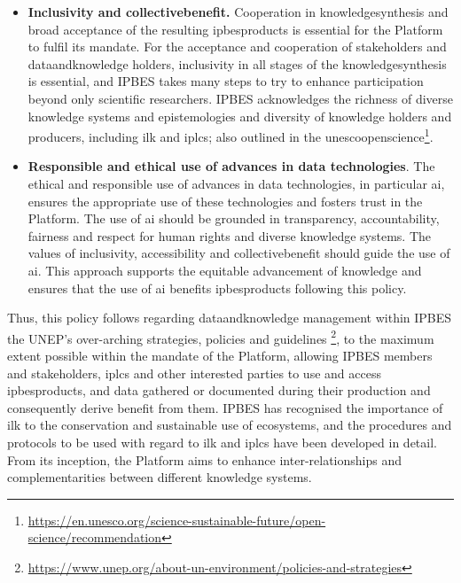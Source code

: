 \documentclass{article}
\begin{document}
\begin{itemize}
    \item \textbf{Inclusivity and \gls{collectivebenefit}.} Cooperation in \gls{knowledgesynthesis} and broad acceptance of the resulting \glspl{ipbesproduct} is essential for the Platform to fulfil its mandate. For the acceptance and cooperation of \glspl{stakeholder} and \gls{dataandknowledge} holders, inclusivity in all stages of the \gls{knowledgesynthesis} is essential, and IPBES takes many steps to try to enhance participation beyond only scientific researchers. IPBES acknowledges the richness of diverse knowledge systems and epistemologies and diversity of knowledge holders and producers, including \gls{ilk} and \glspl{iplc}; also outlined in the \gls{unescoopenscience}\footnote{\href{https://en.unesco.org/science-sustainable-future/open-science/recommendation}{https://en.unesco.org/science-sustainable-future/open-science/recommendation}}.

    \item \textbf{Responsible and ethical use of advances in data technologies}. The ethical and responsible use of advances in data technologies, in particular \gls{ai}, ensures the appropriate use of these technologies and fosters trust in the Platform. The use of \gls{ai} should be grounded in transparency, accountability, fairness and respect for human rights and diverse knowledge systems. The values of inclusivity, accessibility and \gls{collectivebenefit} should guide the use of \gls{ai}. This approach supports the equitable advancement of knowledge and ensures that the use of \gls{ai} benefits \glspl{ipbesproduct} following this policy.
\end{itemize}

Thus, this policy follows regarding \gls{dataandknowledge} management within IPBES the UNEP’s over-arching strategies, policies and guidelines \footnote{\href{https://www.unep.org/about-un-environment/policies-and-strategies}{https://www.unep.org/about-un-environment/policies-and-strategies}}, to the maximum extent possible within the mandate of the Platform, allowing IPBES members and \glspl{stakeholder}, \glspl{iplc} and other interested parties to use and access \glspl{ipbesproduct}, and \gls{data} gathered or documented during their production and consequently derive benefit from them. IPBES has recognised the importance of \gls{ilk} to the conservation and sustainable use of ecosystems, and the procedures and protocols to be used with regard to \gls{ilk} and \glspl{iplc} have been developed in detail. From its inception, the Platform aims to enhance inter-relationships and complementarities between different knowledge systems.
\end{document}
